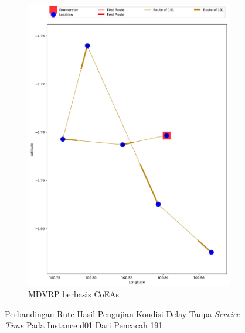\begin{figure}[H]
	\centering
	\begin{subfigure}[t]{\textwidth}
		\centering
		\includegraphics[width=\textwidth]{Resources/Images/delayed_1/real_m15_n100_delayed_1_191_coes}
		\caption{MDVRP berbasis CoEAs}
		\label{fig:real_m15_n100_delayed_1_191_coes}
	\end{subfigure}
	\caption{Perbandingan Rute Hasil Pengujian Kondisi Delay Tanpa \textit{Service Time} Pada Instance d01 Dari Pencacah 191}
	\label{fig:real_m15_n100_delayed_1_191}
\end{figure}



